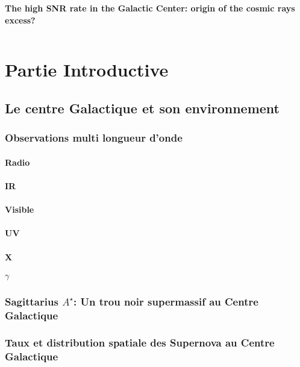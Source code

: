 \documentclass[12pt]{report}
\begin{document}
\begin{center}

\thispagestyle{empty}
\huge
\textbf{The high SNR rate in the Galactic Center: origin of the cosmic rays excess?}
\newline
\end{center}
$\quad$

\newpage

\tableofcontents

\newpage

\part{Partie Introductive}
\chapter{Le centre Galactique et son environnement}
\section{Observations multi longueur d'onde}
\subsection{Radio}
\subsection{IR}
\subsection{Visible}
\subsection{UV}
\subsection{X}
\subsection{$\gamma$}

\section{Sagittarius $A^\star$: Un trou noir supermassif au Centre Galactique}

\section{Taux et distribution spatiale des Supernova au Centre Galactique}
\end{document}
